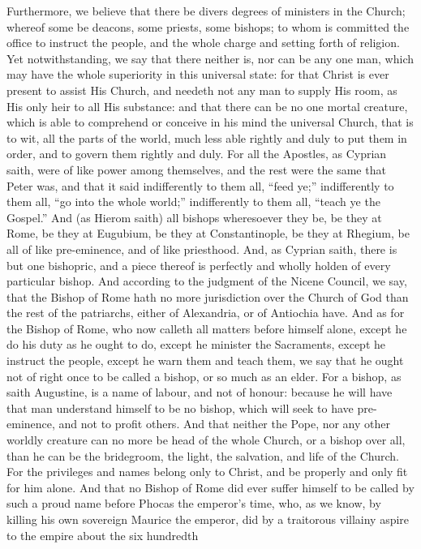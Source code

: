 Furthermore, we believe that there be divers degrees of ministers
in the Church; whereof some be deacons, some priests, some bishops;
to whom is committed the office to instruct the people, and the whole
charge and setting forth of religion. Yet notwithstanding, we
say that there neither is, nor can be any one man, which may have the
whole superiority in this universal state:
for that Christ is ever present to assist His Church, and needeth not
any man to supply His room, as His only heir to all His substance: and
that there can be no one mortal creature, which is able to comprehend
or conceive in his mind the universal Church, that is to wit, all the
parts of the world, much less able rightly and duly to put them in order,
and to govern them rightly and duly. For all the Apostles, as
Cyprian saith, were of like power among themselves, and the rest were
the same that Peter was, and that it said indifferently to them all,
“feed ye;” indifferently to them all, “go into the
whole world;” indifferently to them all, “teach ye the Gospel.”
And (as Hierom saith) all bishops wheresoever they be, be they at Rome,
be they at Eugubium, be they at Constantinople, be they at Rhegium,
be all of like pre-eminence, and of like priesthood. And, as Cyprian
saith, there is but one bishopric, and a piece thereof is perfectly
and wholly holden of every particular bishop. And according to
the judgment of the Nicene Council, we say, that the Bishop of Rome
hath no more jurisdiction over the Church of God than the rest of the
patriarchs, either of Alexandria, or of Antiochia have. And as
for the Bishop of Rome, who now calleth all matters before himself alone,
except he do his duty as
he ought to do, except he minister the Sacraments, except he instruct
the people, except he warn them and teach them, we say that he ought
not of right once to be called a bishop, or so much as an elder.
For a bishop, as saith Augustine, is a name of labour, and not of honour:
because he will have that man understand himself to be no bishop, which
will seek to have pre-eminence, and not to profit others. And
that neither the Pope, nor any other worldly creature can no more be
head of the whole Church, or a bishop over all, than he can be the bridegroom,
the light, the salvation, and life of the Church. For the privileges
and names belong only to Christ, and be properly and only fit for him
alone. And that no Bishop of Rome did ever suffer himself to be
called by such a proud name before Phocas the emperor’s time,
who, as we know, by killing his own sovereign Maurice the emperor, did
by a traitorous villainy aspire to the empire about the six hundredth
